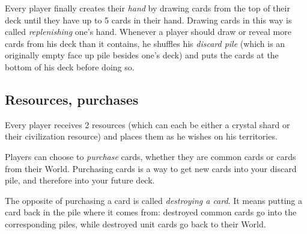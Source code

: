 \documentclass[a4paper]{article}
\begin{document}
        Every player finally creates their \textit{hand} by drawing cards from the top
        of their deck until they have up to 5 cards in their hand.
        Drawing cards in this way is called \textit{replenishing} one's hand.
        Whenever a player should draw or reveal more cards from his deck
        than it contains, he shuffles his \textit{discard pile}
        (which is an originally empty face up pile besides one's deck)
        and puts the cards at the bottom of his deck before doing so.
        
    
\newpage
    \subsection{Resources, purchases}
        \label{how-to-purchase}
        Every player receives 2 resources (which can each be either a crystal shard
        or their civilization resource) and places them as he wishes on his territories.
        
        Players can choose to \textit{purchase} cards,
        whether they are common cards or cards from their World.
        Purchasing cards is a way to get new cards into your discard pile,
        and therefore into your future deck.
        
        The opposite of  purchasing a card is called \textit{destroying a card}.
        It means putting a card back in the pile where it comes from:
        destroyed common cards go into the corresponding piles,
        while destroyed unit cards go back to their World.
\end{document}

